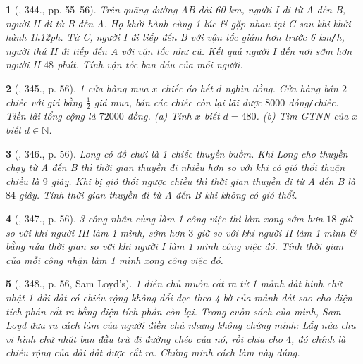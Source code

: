 \documentclass{article}
\newtheorem{baitoan}{}
\begin{document}
\begin{baitoan}[\cite{Binh_Toan_9_tap_2}, 344., pp. 55--56]
	Trên quãng đường AB dài {\rm60 km}, người I đi từ A đến B, người II đi từ B đến A. Họ khởi hành cùng 1 lúc \& gặp nhau tại C sau khi khởi hành {\rm1h12ph}. Từ C, người I đi tiếp đến B với vận tốc giảm hơn trước {\rm6 km{\tt/}h}, người thứ II đi tiếp đến A với vận tốc như cũ. Kết quả người I đến nơi sớm hơn người II $48$ phút. Tính vận tốc ban đầu của mỗi người.
\end{baitoan}

\begin{baitoan}[\cite{Binh_Toan_9_tap_2}, 345., p. 56]
	1 cửa hàng mua $x$ chiếc áo hết $d$ nghìn đồng. Cửa hàng bán $2$ chiếc với giá bằng $\frac{1}{2}$ giá mua, bán các chiếc còn lại lãi được $8000$ đồng{\tt/}chiếc. Tiền lãi tổng cộng là $72000$ đồng. (a) Tính $x$ biết $d = 480$. (b) Tìm {\rm GTNN} của $x$ biết $d\in\mathbb{N}$.
\end{baitoan}

\begin{baitoan}[\cite{Binh_Toan_9_tap_2}, 346., p. 56]
	Long có đồ chơi là 1 chiếc thuyền buồm. Khi Long cho thuyền chạy từ A đến B thì thời gian thuyền đi nhiều hơn so với khi có gió thổi thuận chiều là $9$ giây. Khi bị gió thổi ngược chiều thì thời gian thuyền đi từ A đến B là $84$ giây. Tính thời gian thuyền đi từ A đến B khi không có gió thổi.
\end{baitoan}

\begin{baitoan}[\cite{Binh_Toan_9_tap_2}, 347., p. 56]
	3 công nhân cùng làm 1 công việc thì làm xong sớm hơn $18$ giờ so với khi người III làm 1 mình, sớm hơn $3$ giờ so với khi người II làm 1 mình \& bằng nửa thời gian so với khi người I làm 1 mình công việc đó. Tính thời gian của mỗi công nhận làm 1 mình xong công việc đó.
\end{baitoan}

\begin{baitoan}[\cite{Binh_Toan_9_tap_2}, 348., p. 56, Sam Loyd's]
	1 điền chủ muốn cắt ra từ 1 mảnh đất hình chữ nhật 1 dải đất có chiều rộng không đổi dọc theo 4 bờ của mảnh đất sao cho diện tích phần cắt ra bằng diện tích phần còn lại. Trong cuốn sách của mình, Sam Loyd đưa ra cách làm của người điền chủ nhưng không chứng minh: Lấy nửa chu vi hình chữ nhật ban đầu trừ đi đường chéo của nó, rồi chia cho $4$, đó chính là chiều rộng của dải đất được cắt ra. Chứng minh cách làm này đúng.
\end{baitoan}
\end{document}
